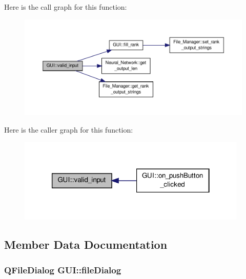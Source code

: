 Here is the call graph for this function\-:\nopagebreak
\begin{figure}[H]
\begin{center}
\leavevmode
\includegraphics[width=350pt]{d7/d46/a00002_a5ec9d8a051303b218c4542f96a87b56f_cgraph}
\end{center}
\end{figure}




Here is the caller graph for this function\-:\nopagebreak
\begin{figure}[H]
\begin{center}
\leavevmode
\includegraphics[width=310pt]{d7/d46/a00002_a5ec9d8a051303b218c4542f96a87b56f_icgraph}
\end{center}
\end{figure}




\subsection{Member Data Documentation}
\hypertarget{a00002_a9ed0a8b583419e88bb94697a9b258c72}{
\subsubsection[{file\-Dialog}]{\setlength{\rightskip}{0pt plus 5cm}Q\-File\-Dialog G\-U\-I\-::file\-Dialog\hspace{0.3cm}{\ttfamily [private]}}}\label{d7/d46/a00002_a9ed0a8b583419e88bb94697a9b258c72}


